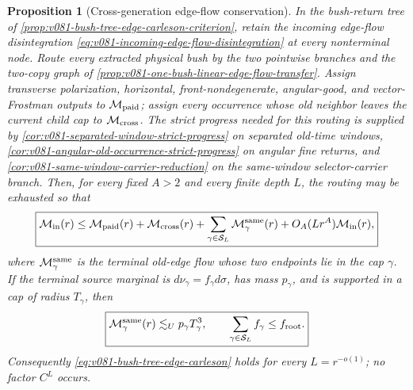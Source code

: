 \documentclass[10pt]{article}
\newtheorem{proposition}[theorem]{Proposition}
\begin{document}
\begin{proposition}[Cross-generation edge-flow conservation]
\label{thm:v081-cross-generation-edge-flow-conservation}
In the bush-return tree of
\cref{prop:v081-bush-tree-edge-carleson-criterion}, retain the incoming edge-flow disintegration
\eqref{eq:v081-incoming-edge-flow-disintegration} at every nonterminal node.  Route every extracted
physical bush by the two pointwise branches and the two-copy graph of
\cref{prop:v081-one-bush-linear-edge-flow-transfer}.  Assign transverse polarization, horizontal,
front-nondegenerate, angular-good, and vector-Frostman outputs to
\(\mathcal M_{\rm paid}\); assign every occurrence whose old neighbor leaves the current child cap
to \(\mathcal M_{\rm cross}\).  The strict progress needed for this routing is supplied by
\cref{cor:v081-separated-window-strict-progress} on separated old-time windows,
\cref{cor:v081-angular-old-occurrence-strict-progress} on angular fine returns, and
\cref{cor:v081-same-window-carrier-reduction} on the same-window selector-carrier branch.  Then,
for every fixed \(A>2\) and every finite depth \(L\), the routing may be exhausted so that
\begin{equation}
\label{eq:v081-finite-depth-edge-flow-conservation}
\boxed{
\mathcal M_{\rm in}(r)
\le
\mathcal M_{\rm paid}(r)
+
\mathcal M_{\rm cross}(r)
+
\sum_{\gamma\in\mathcal S_L}\mathcal M_{\gamma}^{\rm same}(r)
+
O_A(Lr^A)\mathcal M_{\rm in}(r),
}
\end{equation}
where \(\mathcal M_{\gamma}^{\rm same}\) is the terminal old-edge flow whose two endpoints lie in
the cap \(\gamma\).  If the terminal source marginal is
\(d\nu_\gamma=f_\gamma d\sigma\), has mass \(p_\gamma\), and is supported in a cap of radius
\(T_\gamma\), then
\begin{equation}
\label{eq:v081-terminal-markov-cap-bound}
\boxed{
\mathcal M_{\gamma}^{\rm same}(r)
\lesssim_U p_\gamma T_\gamma^3,
\qquad
\sum_{\gamma\in\mathcal S_L}f_\gamma\le f_{\rm root}.
}
\end{equation}
Consequently \eqref{eq:v081-bush-tree-edge-carleson} holds for every
\(L=r^{-o(1)}\); no factor \(C^L\) occurs.
\end{proposition}
\end{document}
